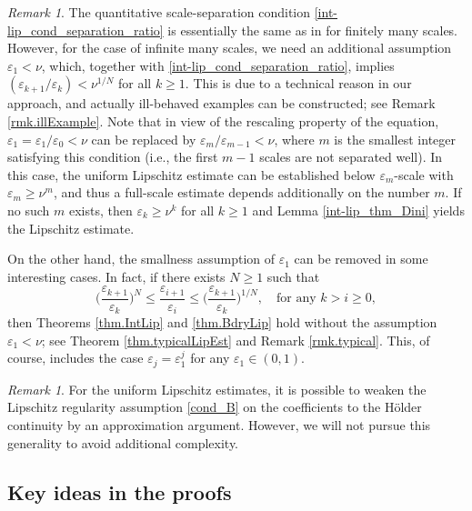 \documentclass[reqno,12pt]{amsart} %
\theoremstyle{definition}
\theoremstyle{remark}
\newtheorem{remark}[theorem]{Remark}
\numberwithin{equation}{section}
\newcommand{\e}{\varepsilon}
\begin{document}
\begin{remark}\label{rmk.smallnu}
    The quantitative scale-separation condition \eqref{int-lip_cond_separation_ratio} is essentially the same as in \cite{Niu20_reiterated} for finitely many scales. However,
    for the case of infinite many scales, we need an additional  assumption $\e_1 < \nu$, which, together with \eqref{int-lip_cond_separation_ratio}, implies 
    $(\e_{k+1}/\e_k) < \nu^{1/N}$ for all $k \ge 1$. This is due to a technical reason in our approach, and actually ill-behaved examples can be constructed; see Remark \ref{rmk.illExample}. Note that in view of the rescaling property of the equation, $\e_1 = \e_1/\e_0 < \nu$ can be replaced by $\e_{m}/\e_{m-1} < \nu$, where $m$ is the smallest integer satisfying this condition (i.e., the first $m-1$ scales are not separated well). In this case, the uniform Lipschitz estimate can be established below $\e_m$-scale with $\e_m \ge \nu^m$, and thus a full-scale estimate depends additionally on the number $m$. If no such $m$ exists, then $\e_k \ge \nu^k$ for all $k \ge 1$ and Lemma \ref{int-lip_thm_Dini} yields the Lipschitz estimate.
    
    On the other hand, the smallness assumption of $\e_1$ can be removed in some interesting cases. In fact, if there exists $N \ge 1$ such that
    \begin{equation*}
        \bigg(\frac{\varepsilon_{k+1}}{\varepsilon_{k}}\bigg)^N\leq \frac{\varepsilon_{i+1}}{\varepsilon_{i}} \le \bigg(\frac{\varepsilon_{k+1}}{\varepsilon_{k}}\bigg)^{1/N}, \quad \text{for any } k > i \ge 0,
    \end{equation*}
    then Theorems \ref{thm.IntLip} and \ref{thm.BdryLip} hold without the assumption $\e_1 < \nu$; see Theorem \ref{thm.typicalLipEst} and Remark \ref{rmk.typical}. This, of course, includes the case $\e_j = \e_1^j$ for any $\e_1 \in (0,1)$.
\end{remark}

\begin{remark}
    For the uniform Lipschitz estimates, it is possible to weaken the Lipschitz regularity assumption \eqref{cond_B} on the coefficients to the H\"{o}lder continuity by an approximation argument. However, we will not pursue this generality to avoid additional complexity.
\end{remark}

\subsection{Key ideas in the proofs}
\end{document}
